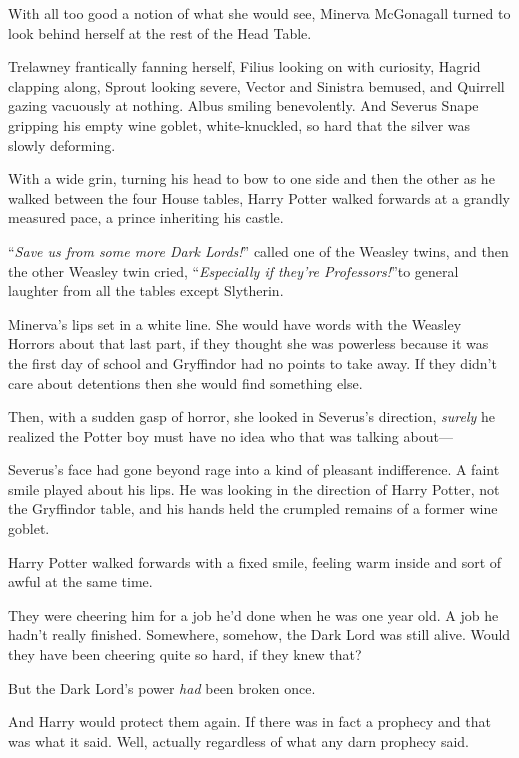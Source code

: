 With all too good a notion of what she would see, Minerva McGonagall turned to
look behind herself at the rest of the Head Table.

Trelawney frantically fanning herself, Filius looking on with curiosity, Hagrid
clapping along, Sprout looking severe, Vector and Sinistra bemused, and
Quirrell gazing vacuously at nothing. Albus smiling benevolently. And Severus
Snape gripping his empty wine goblet, white-knuckled, so hard that the silver
was slowly deforming.

With a wide grin, turning his head to bow to one side and then the other as he
walked between the four House tables, Harry Potter walked forwards at a grandly
measured pace, a prince inheriting his castle.

“\emph{Save us from some more Dark Lords!}” called one of the Weasley twins,
and then the other Weasley twin cried, “\emph{Especially if they’re
Professors!}”to general laughter from all the tables except Slytherin.

Minerva’s lips set in a white line. She would have words with the Weasley
Horrors about that last part, if they thought she was powerless because it was
the first day of school and Gryffindor had no points to take away. If they
didn’t care about detentions then she would find something else.

Then, with a sudden gasp of horror, she looked in Severus’s direction,
\emph{surely} he realized the Potter boy must have no idea who that was talking
about—

Severus’s face had gone beyond rage into a kind of pleasant indifference. A
faint smile played about his lips. He was looking in the direction of Harry
Potter, not the Gryffindor table, and his hands held the crumpled remains of a
former wine goblet.

\later

Harry Potter walked forwards with a fixed smile, feeling warm inside and sort
of awful at the same time.

They were cheering him for a job he’d done when he was one year old. A job he
hadn’t really finished. Somewhere, somehow, the Dark Lord was still alive.
Would they have been cheering quite so hard, if they knew that?

But the Dark Lord’s power \emph{had} been broken once.

And Harry would protect them again. If there was in fact a prophecy and that
was what it said. Well, actually regardless of what any darn prophecy said.

